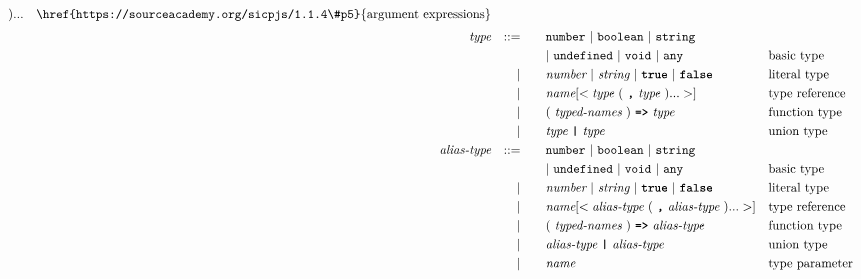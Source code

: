 \begin{alignat*}{9}
                                                                      ) ...
                                                            && \textrm{\href{https://sourceacademy.org/sicpjs/1.1.4\#p5}{argument expressions}}\\[1mm]
&& \textit{type}         && ::= &\quad &&  \texttt{number}\ |\ \texttt{boolean}\ |\ \texttt{string} \\
&&                       &&     &      &&  |\ \texttt{undefined}\ |\ \texttt{void}\ |\ \texttt{any}\ && \textrm{basic type}\\
&&                       && |   &\quad &&  \textit{number}\ |\ \textit{string}\ |\ \textbf{\texttt{true}}\ |\ \textbf{\texttt{false}} && \textrm{literal type}\\
&&                       && |   &\quad &&  \textit{name}[<\textit{type}\ (\ \textbf{\texttt{,}} \ \textit{type}\ ) ...>]   && \textrm{type reference}\\
&&                       && |   &\quad &&   (\ \textit{typed-names}\ )\ \texttt{\textbf{=>}}\ \textit{type} && \textrm{function type}\\
&&                       && |   &\quad &&   \textit{type}\ \texttt{\textbf{|}}\ \textit{type} && \textrm{union type}\\
&& \textit{alias-type}         && ::= &\quad &&  \texttt{number}\ |\ \texttt{boolean}\ |\ \texttt{string} \\
&&                       &&     &      &&  |\ \texttt{undefined}\ |\ \texttt{void}\ |\ \texttt{any}\ && \textrm{basic type}\\
&&                       && |   &\quad &&  \textit{number}\ |\ \textit{string}\ |\ \textbf{\texttt{true}}\ |\ \textbf{\texttt{false}} && \textrm{literal type}\\
&&                       && |   &\quad &&  \textit{name}[<\textit{alias-type}\ (\ \textbf{\texttt{,}} \ \textit{alias-type}\ ) ...>]   && \textrm{type reference}\\
&&                       && |   &\quad &&   (\ \textit{typed-names}\ )\ \texttt{\textbf{=>}}\ \textit{alias-type} && \textrm{function type}\\
&&                       && |   &\quad &&   \textit{alias-type}\ \texttt{\textbf{|}}\ \textit{alias-type} && \textrm{union type}\\
&&                       && |   &\quad &&  \textit{name}   && \textrm{type parameter}\\
\end{alignat*}
